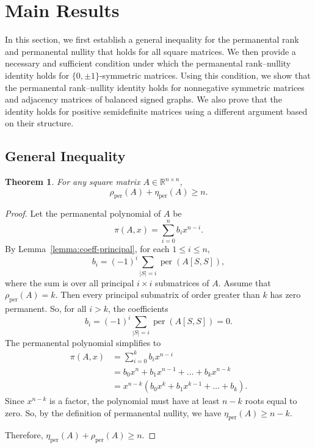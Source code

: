 \documentclass[11pt]{article}
\DeclareMathOperator{\per}{per}
\theoremstyle{plain}
\newtheorem{theorem}{Theorem}[section]   %
\theoremstyle{definition}
\theoremstyle{remark}
\begin{document}
\section{Main Results} \label{mainresults}




In this section, we first establish a general inequality for the permanental rank and permanental nullity that holds for all square matrices. We then provide a necessary and sufficient condition under which the permanental rank–nullity identity holds for $\{0,\pm1\}$-symmetric matrices. Using this condition, we show that the permanental rank–nullity identity holds for nonnegative symmetric matrices and adjacency matrices of balanced signed graphs. We also prove that the identity holds for positive semidefinite matrices using a different argument based on their structure.

\subsection{General Inequality}

\begin{theorem}\label{prop:general-inequality}
For any square matrix \( A \in \mathbb{R}^{n \times n} \),  
\[
\rho_{\operatorname{per}}(A) + \eta_{\operatorname{per}}(A) \geq n.
\]
\end{theorem}

\begin{proof}
Let the permanental polynomial of \( A \) be
\[
\pi(A,x) = \sum_{i=0}^n b_i x^{n - i}.
\]
By Lemma~\ref{lemma:coeff-principal}, for each \( 1 \leq i \leq n \),
\[
b_i = (-1)^i \sum_{|S| = i} \operatorname{per}(A[S, S]),
\]
where the sum is over all principal \( i \times i \) submatrices of \( A \).
Assume that  \(\rho_{\per}(A) =k \). Then every principal submatrix of order greater than \(k\) has zero permanent. So, for all $i > k$, the coefficients
\[
b_i = (-1)^i \sum_{|S| = i} \operatorname{per}(A[S,S]) = 0.
\]
The permanental polynomial simplifies to
\[
\begin{aligned}
\pi(A, x) &= \sum_{i = 0}^{k} b_i x^{n - i} \\
          &=  b_0 x^n + b_1 x^{n-1} + \dots + b_k x^{n - k} \\
          &= x^{n - k}(b_0 x^k + b_1 x^{k - 1} + \dots + b_k).
\end{aligned}
\]
Since \( x^{n-k} \) is a factor, the polynomial must have at least \( n - k \) roots equal to zero. So, by the definition of permanental nullity, we have
\(
\eta_{\per}(A) \geq n - k.
\)


Therefore, 
\(
\eta_{\per}(A) + \rho_{\per}(A) \geq n.
\)\end{proof}
\end{document}
